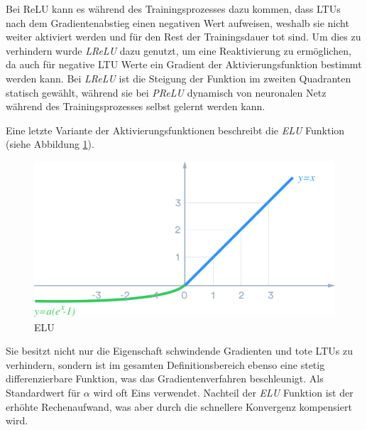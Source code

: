 Bei ReLU kann es während des Trainingsprozesses dazu kommen, dass LTUs nach dem Gradientenabstieg einen negativen Wert aufweisen, weshalb sie nicht weiter aktiviert werden und für den Rest der Trainingsdauer \glqq tot\grqq{} sind. Um dies zu verhindern wurde \textit{LReLU} dazu genutzt, um eine Reaktivierung zu ermöglichen, da auch für negative LTU Werte ein Gradient der Aktivierungsfunktion bestimmt werden kann. Bei \textit{LReLU} ist die Steigung der Funktion im zweiten Quadranten statisch gewählt, während sie bei \textit{PReLU} dynamisch von neuronalen Netz während des Trainingsprozesses selbst gelernt werden kann. \cite[S. 280 f.]{AurelienGeron.2018}

Eine letzte Variante der Aktivierungsfunktionen beschreibt die \textit{ELU} Funktion (siehe Abbildung \ref{elu}).

\begin{figure}[ht]
	\begin{center}
		\includegraphics[width=15cm]{Bilder/elu.png} 
		\caption[ELU]{ELU \cite{DanqingLiu.20171130}}
		\label{elu}
	\end{center}
\end{figure}

Sie besitzt nicht nur die Eigenschaft schwindende Gradienten und tote LTUs zu verhindern, sondern ist im gesamten Definitionsbereich ebenso eine stetig differenzierbare Funktion, was das Gradientenverfahren beschleunigt. Als Standardwert für $\alpha$ wird oft Eins verwendet. Nachteil der \textit{ELU} Funktion ist der erhöhte Rechenaufwand, was aber durch die schnellere Konvergenz kompensiert wird. \cite[S. 280 f.]{AurelienGeron.2018}
